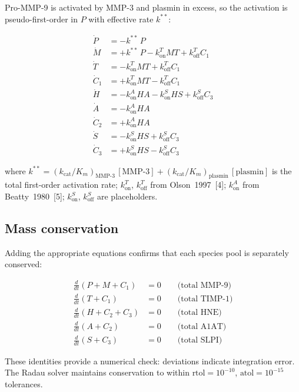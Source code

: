 \documentclass[10pt,a4paper]{article}
\numberwithin{equation}{section}
\newcommand{\kon}{k_{\text{on}}}
\newcommand{\koff}{k_{\text{off}}}
\newcommand{\cit}[1]{[#1]}   %
\begin{document}
Pro-MMP-9 is activated by MMP-3 and plasmin in excess, so the activation is
pseudo-first-order in $P$ with effective rate $k^{**}$:

\begin{align}
\dot{P}   &= -k^{**}\,P \label{eq:dP} \\
\dot{M}   &= +k^{**}\,P - \kon^T MT + \koff^T C_1 \label{eq:dM2} \\
\dot{T}   &= -\kon^T MT + \koff^T C_1 \label{eq:dT2} \\
\dot{C}_1 &= +\kon^T MT - \koff^T C_1 \label{eq:dC12} \\
\dot{H}   &= -\kon^A HA - \kon^S HS + \koff^S C_3 \label{eq:dH2} \\
\dot{A}   &= -\kon^A HA \label{eq:dA} \\
\dot{C}_2 &= +\kon^A HA \label{eq:dC2} \\
\dot{S}   &= -\kon^S HS + \koff^S C_3 \label{eq:dS} \\
\dot{C}_3 &= +\kon^S HS - \koff^S C_3 \label{eq:dC3}
\end{align}

where $k^{**} = (k_{\text{cat}}/K_m)_{\text{MMP-3}}\,[\text{MMP-3}]
+ (k_{\text{cat}}/K_m)_{\text{plasmin}}\,[\text{plasmin}]$ is the total first-order
activation rate; $\kon^T$, $\koff^T$ from Olson~1997~\cit{4};
$\kon^A$ from Beatty~1980~\cit{5}; $\kon^S$, $\koff^S$ are placeholders.

\subsection{Mass conservation}

Adding the appropriate equations confirms that each species pool is separately conserved:

\begin{align*}
\tfrac{d}{dt}(P + M + C_1)    &= 0 \qquad \text{(total MMP-9)} \\
\tfrac{d}{dt}(T + C_1)        &= 0 \qquad \text{(total TIMP-1)} \\
\tfrac{d}{dt}(H + C_2 + C_3)  &= 0 \qquad \text{(total HNE)} \\
\tfrac{d}{dt}(A + C_2)        &= 0 \qquad \text{(total A1AT)} \\
\tfrac{d}{dt}(S + C_3)        &= 0 \qquad \text{(total SLPI)}
\end{align*}

These identities provide a numerical check: deviations indicate integration error.
The Radau solver maintains conservation to within
$\text{rtol} = 10^{-10}$, $\text{atol} = 10^{-15}$ tolerances.
\end{document}
